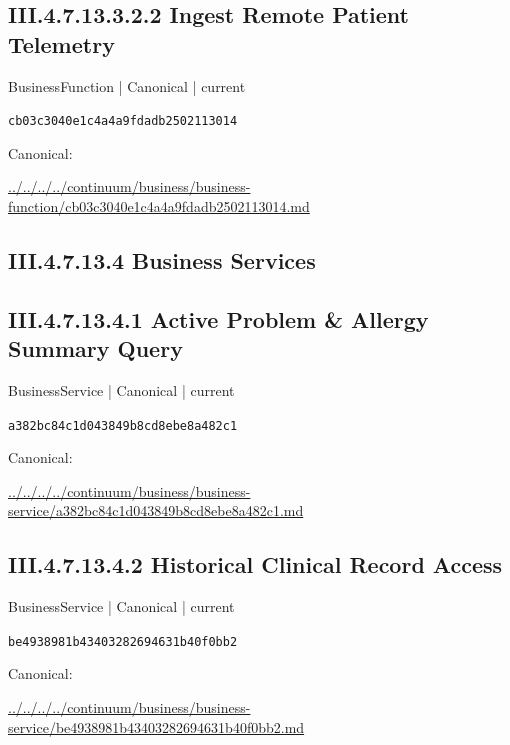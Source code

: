 \documentclass[10pt,a4paper]{article}
\begin{document}
\subsection*{III.4.7.13.3.2.2 Ingest Remote Patient Telemetry}
\label{element-cb03c3040e1c4a4a9fdadb2502113014}
{\small BusinessFunction | Canonical | current}\par
\texttt{cb03c3040e1c4a4a9fdadb2502113014}\par
Canonical: \par
{\footnotesize\url{../../../../continuum/business/business-function/cb03c3040e1c4a4a9fdadb2502113014.md}}\par
\subsection*{III.4.7.13.4 Business Services}
\subsection*{III.4.7.13.4.1 Active Problem \& Allergy Summary Query}
\label{element-a382bc84c1d043849b8cd8ebe8a482c1}
{\small BusinessService | Canonical | current}\par
\texttt{a382bc84c1d043849b8cd8ebe8a482c1}\par
Canonical: \par
{\footnotesize\url{../../../../continuum/business/business-service/a382bc84c1d043849b8cd8ebe8a482c1.md}}\par
\subsection*{III.4.7.13.4.2 Historical Clinical Record Access}
\label{element-be4938981b43403282694631b40f0bb2}
{\small BusinessService | Canonical | current}\par
\texttt{be4938981b43403282694631b40f0bb2}\par
Canonical: \par
{\footnotesize\url{../../../../continuum/business/business-service/be4938981b43403282694631b40f0bb2.md}}\par
\end{document}

